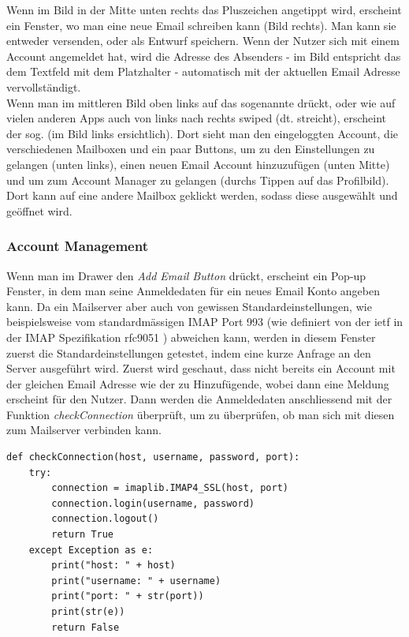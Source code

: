 \documentclass[a4paper,11pt]{article}
\begin{document}
Wenn im Bild in der Mitte unten rechts das Pluszeichen angetippt wird, erscheint ein Fenster, wo man eine neue Email schreiben kann (Bild rechts). Man kann sie entweder versenden, oder als Entwurf speichern. Wenn der Nutzer sich mit einem Account angemeldet hat, wird die Adresse des Absenders - im Bild entspricht das dem Textfeld mit dem Platzhalter  - automatisch mit der aktuellen Email Adresse vervollständigt.\\

Wenn man im mittleren Bild oben links auf das sogenannte  drückt, oder wie auf vielen anderen Apps auch von links nach rechts swiped (dt. streicht), erscheint der sog.  (im Bild links ersichtlich). Dort sieht man den eingeloggten Account, die verschiedenen Mailboxen und ein paar Buttons, um zu den Einstellungen zu gelangen (unten links), einen neuen Email Account hinzuzufügen (unten Mitte) und um zum Account Manager zu gelangen (durchs Tippen auf das Profilbild). Dort kann auf eine andere Mailbox geklickt werden, sodass diese ausgewählt und geöffnet wird.


\newpage

\subsubsection{Account Management}

Wenn man im Drawer den \textit{Add Email Button} drückt, erscheint ein Pop-up Fenster, in dem man seine Anmeldedaten für ein neues Email Konto angeben kann. Da ein Mailserver aber auch von gewissen Standardeinstellungen, wie beispielsweise vom standardmässigen IMAP Port 993 (wie definiert von der \gls{ietf} in der IMAP Spezifikation rfc9051 \cite{rfc9051}) abweichen kann, werden in diesem Fenster zuerst die Standardeinstellungen getestet, indem eine kurze Anfrage an den Server ausgeführt wird. Zuerst wird geschaut, dass nicht bereits ein Account mit der gleichen Email Adresse wie der zu Hinzufügende, wobei dann eine Meldung erscheint für den Nutzer. Dann werden die Anmeldedaten anschliessend mit der Funktion \textit{checkConnection} überprüft, um zu überprüfen, ob man sich mit diesen zum Mailserver verbinden kann.\\

\lstset{language=python}
\begin{lstlisting}
def checkConnection(host, username, password, port):
    try:
        connection = imaplib.IMAP4_SSL(host, port)
        connection.login(username, password)
        connection.logout()
        return True
    except Exception as e:
        print("host: " + host)
        print("username: " + username)
        print("port: " + str(port))
        print(str(e))
        return False

\end{lstlisting}
\end{document}
